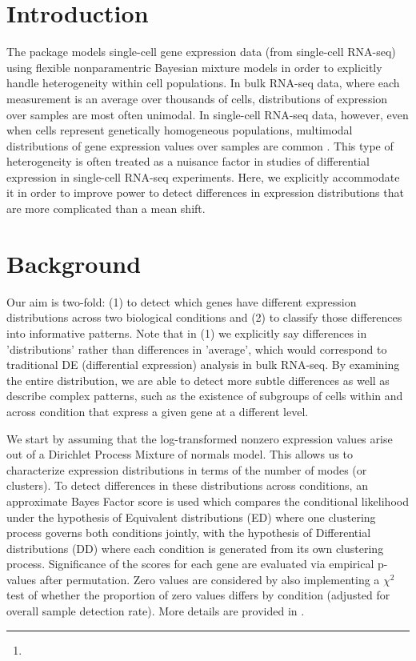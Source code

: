 \documentclass{article}
\author{Keegan Korthauer\footnote{\email{keegan@jimmy.harvard.edu}}}
\begin{document}


\maketitle
\tableofcontents



\section{Introduction}

The  package models single-cell gene expression data (from single-cell RNA-seq) using flexible nonparamentric Bayesian mixture models in order to explicitly handle heterogeneity within cell populations.  In bulk RNA-seq data, where each measurement is an average over thousands of cells, distributions of expression over samples are most often unimodal.  In single-cell RNA-seq data, however, even when cells represent genetically homogeneous populations, multimodal distributions of gene expression values over samples are common \cite{korthauer2015}.  This type of heterogeneity is often treated as a nuisance factor in studies of differential expression in single-cell RNA-seq experiments.  Here, we explicitly accommodate it in order to improve power to detect differences in expression distributions that are more complicated than a mean shift.

\section{Background}

Our aim is two-fold: (1) to detect which genes have different expression distributions across two biological conditions and (2) to classify those differences into informative patterns.  Note that in (1) we explicitly say differences in 'distributions' rather than differences in 'average', which would correspond to traditional DE (differential expression) analysis in bulk RNA-seq.  By examining the entire distribution, we are able to detect more subtle differences as well as describe complex patterns, such as the existence of subgroups of cells within and across condition that express a given gene at a different level.

We start by assuming that the log-transformed nonzero expression values arise out of a Dirichlet Process Mixture of normals model.  This allows us to characterize expression distributions in terms of the number of modes (or clusters).  To detect differences in these distributions across conditions, an approximate Bayes Factor score is used which compares the conditional likelihood under the hypothesis of Equivalent distributions (ED) where one clustering process governs both conditions jointly, with the hypothesis of Differential distributions (DD) where each condition is generated from its own clustering process.  Significance of the scores for each gene are evaluated via empirical p-values after permutation.  Zero values are considered by also implementing a $\chi^2$ test of whether the proportion of zero values differs by condition (adjusted for overall sample detection rate).  More details are provided in \cite{korthauer2015}.
\end{document}

